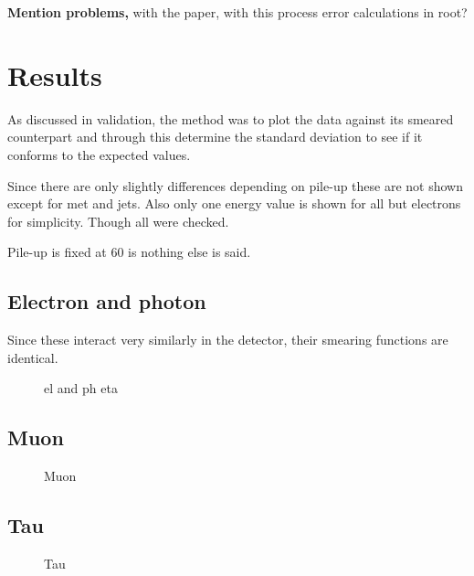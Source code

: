 \textbf{Mention problems,} with the paper, with this process error calculations in root?

\section{Results}\label{cha:vali:sec:results}
As discussed in validation, the method was to plot the data against its smeared counterpart and through this determine the standard deviation to see if it conforms to the expected values.

Since there are only slightly differences depending on pile-up these are not shown except for met and jets. Also only one energy value is shown for all but electrons for simplicity. Though all were checked.

Pile-up is fixed at 60 is nothing else is said.
\subsection{Electron and photon}
Since these interact very  similarly in the detector, their smearing functions are identical.
 \begin{figure}[H] %
    \hfill
{}
    \hfill
    \hfill
{}
    \caption{el and ph eta}
    \label{fig:elph}
\end{figure}
\subsection{Muon}
 \begin{figure}[H] %
    \hfill
    \caption{Muon}
    \label{fig:muon}
  \end{figure}

\subsection{Tau}
 \begin{figure}[H] %
    \hfill
    \caption{Tau}
    \label{fig:tau}
  \end{figure}
